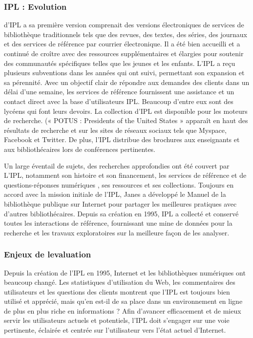 \documentclass[french,a4paper,12pt]{article}
\begin{document}
\subsubsection{ IPL : Evolution}

\quad d'IPL a  sa première version comprenait des versions électroniques de services de bibliothèque traditionnels tels que des revues, des textes, des séries, des journaux et des services de référence par courrier électronique. Il a été bien accueilli et a continué de croître avec des ressources supplémentaires et élargies pour soutenir des communautés spécifiques telles que les jeunes et les enfants. L'IPL a reçu plusieurs subventions dans les années qui ont suivi, permettant son expansion et sa pérennité. Avec un objectif clair de répondre aux demandes des clients dans un délai d'une semaine, les services de référence fournissent une assistance et un contact direct avec la base d'utilisateurs IPL. Beaucoup d'entre eux sont des lycéens qui font leurs devoirs. La collection d'IPL est disponible pour les moteurs de recherche.  (« POTUS : Presidents of the United States » apparaît en haut des résultats de recherche et sur les sites de réseaux sociaux tels que Myspace, Facebook et Twitter. De plus, l'IPL distribue des brochures aux enseignants et aux bibliothécaires lors de conférences pertinentes.

\quad  Un large éventail de sujets, des recherches approfondies ont été couvert par  L'IPL, notamment son histoire et son financement, les services de référence et de questions-réponses numériques , ses ressources et ses collections. Toujours en accord avec la mission initiale de l'IPL, Janes a développé le Manuel de la bibliothèque publique sur Internet pour partager les meilleures pratiques avec d'autres bibliothécaires. Depuis sa création en 1995, IPL a collecté et conservé toutes les interactions de référence, fournissant une mine de données pour la recherche et les travaux exploratoires sur la meilleure façon de les analyser.

\subsubsection{Enjeux de levaluation}

\quad Depuis la création de l'IPL en 1995, Internet et les bibliothèques numériques ont beaucoup changé. Les statistiques d'utilisation du Web, les commentaires des utilisateurs et les questions des clients montrent que l'IPL est toujours bien utilisé et apprécié, mais qu'en est-il de sa place dans un environnement en ligne de plus en plus riche en informations ?  Afin d'avancer efficacement et de mieux servir les utilisateurs actuels et potentiels, l'IPL doit s'engager sur une voie pertinente, éclairée et centrée sur l'utilisateur vers l'état actuel d'Internet.
\end{document}
